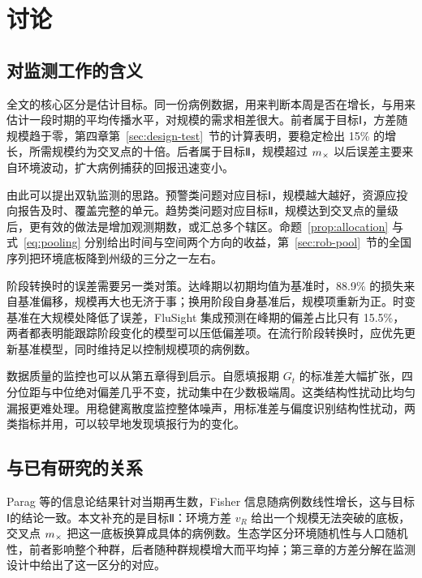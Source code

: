 \section{讨论}
\label{sec:rob-discussion}

\subsection{对监测工作的含义}

全文的核心区分是估计目标。同一份病例数据，用来判断本周是否在增长，与用来估计一段时期的平均传播水平，对规模的需求相差很大。前者属于目标Ⅰ，方差随规模趋于零，第四章第~\ref{sec:design-test}~节的计算表明，要稳定检出 15\% 的增长，所需规模约为交叉点的十倍。后者属于目标Ⅱ，规模超过 $m_{\times}$ 以后误差主要来自环境波动，扩大病例捕获的回报迅速变小。

由此可以提出双轨监测的思路。预警类问题对应目标Ⅰ，规模越大越好，资源应投向报告及时、覆盖完整的单元。趋势类问题对应目标Ⅱ，规模达到交叉点的量级后，更有效的做法是增加观测期数，或汇总多个辖区。命题~\ref{prop:allocation} 与式~\eqref{eq:pooling} 分别给出时间与空间两个方向的收益，第~\ref{sec:rob-pool}~节的全国序列把环境底板降到州级的三分之一左右。

阶段转换时的误差需要另一类对策。达峰期以初期均值为基准时，88.9\% 的损失来自基准偏移，规模再大也无济于事；换用阶段自身基准后，规模项重新为正。时变基准在大规模处降低了误差，FluSight 集成预测在峰期的偏差占比只有 15.5\%，两者都表明能跟踪阶段变化的模型可以压低偏差项。在流行阶段转换时，应优先更新基准模型，同时维持足以控制规模项的病例数。

数据质量的监控也可以从第五章得到启示。自愿填报期 $G_t$ 的标准差大幅扩张，四分位距与中位绝对偏差几乎不变，扰动集中在少数极端周。这类结构性扰动比均匀漏报更难处理。用稳健离散度监控整体噪声，用标准差与偏度识别结构性扰动，两类指标并用，可以较早地发现填报行为的变化。

\subsection{与已有研究的关系}

Parag 等的信息论结果针对当期再生数，Fisher 信息随病例数线性增长\citep{parag2022quantifying, parag2022fundamental}，这与目标Ⅰ的结论一致。本文补充的是目标Ⅱ：环境方差 $v_R$ 给出一个规模无法突破的底板，交叉点 $m_{\times}$ 把这一底板换算成具体的病例数。生态学区分环境随机性与人口随机性\citep{engen1998demographic, rohani2002determinism}，前者影响整个种群，后者随种群规模增大而平均掉；第三章的方差分解在监测设计中给出了这一区分的对应。

